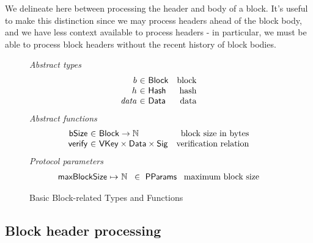 \documentclass[11pt,a4paper]{article}
\newcommand{\var}[1]{\mathit{#1}}
\newcommand{\fun}[1]{\mathsf{#1}}
\newcommand{\type}[1]{\mathsf{#1}}
\newcommand{\pp}[1]{\mathsf{#1}}
\newcommand{\totalf}{\to}
\newcommand{\partialf}{\mapsto}
\newcommand{\Hash}{\type{Hash}}  %
\newcommand{\Block}{\type{Block}}
\newcommand{\VKey}{\type{VKey}}
\newcommand{\Sig}{\type{Sig}}
\newcommand{\Data}{\type{Data}}
\newcommand{\ProtParams}{\type{PParams}} %
\newcommand{\bsizename}{bSize}
\newcommand{\verifyname}{verify}
\begin{document}
\newcommand{\butxo}[1]{\fun{bUtxo}\ #1}

\newcommand{\maxblocksize}{\pp{maxBlockSize}}
\newcommand{\maxheadersize}{\pp{maxHeaderSize}}

\newcommand{\UTxO}{\type{UTxO}}
\newcommand{\DIEnv}{\type{DIEnv}}
\newcommand{\DIState}{\type{DIState}}

We delineate here between processing the header and body of a block. It's useful
to make this distinction since we may process headers ahead of the
block body, and we have less context available to process headers - in
particular, we must be able to process block headers without the recent history
of block bodies.

\begin{figure}[ht]
  \emph{Abstract types}
  \begin{equation*}
    \begin{array}{r@{~\in~}lr}
      b & \Block & \text{block} \\
      h & \Hash   & \text{hash} \\
      \var{data} & \Data    & \text{data}
    \end{array}
  \end{equation*}
  \emph{Abstract functions}
  \begin{equation*}
    \begin{array}{r@{~\in~}lr}
      \fun{\bsizename} & \Block \totalf \mathbb{N} & \text{block size in bytes} \\
      \fun{\verifyname} & \VKey \times \Data \times \Sig & \text{verification relation} \\
    \end{array}
  \end{equation*}
  \emph{Protocol parameters}
  \begin{equation*}
    \begin{array}{r@{~\partialf~}l!{~\in~\ProtParams~}r}
      \maxblocksize & \mathbb{N} & \text{maximum block size} \\
    \end{array}
  \end{equation*}
  \caption{Basic Block-related Types and Functions}
  \label{fig:block-defs}
\end{figure}

\subsection{Block header processing}
\end{document}
